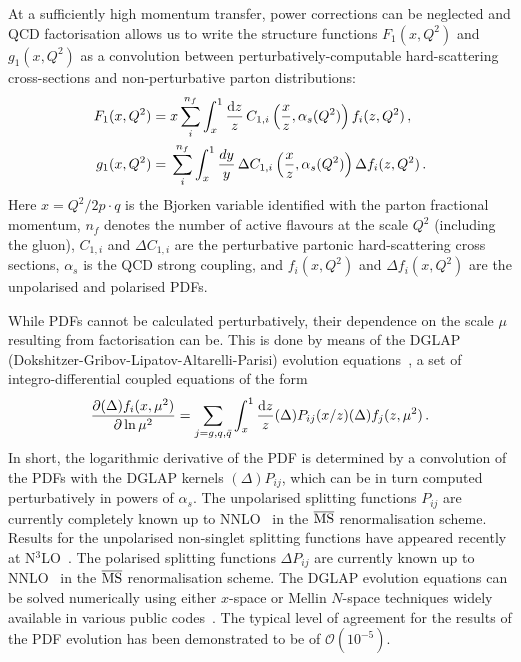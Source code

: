 At a sufficiently high momentum transfer, power corrections can be neglected and
QCD factorisation allows us to write the structure functions 
$F_1(x,Q^2)$ and $g_1(x,Q^2)$ as a convolution between perturbatively-computable
hard-scattering cross-sections and non-perturbative parton distributions:
\begin{align}
F_1(x,Q^2) 
= {} 
& x\sum_i^{n_f} \int_x^1 \frac{{\rm d}z}{z}\,C_{1,i}\left(\frac{x}{z},\alpha_s(Q^2)\right)f_i(z,Q^2) \,, \label{eq:Fi}\\
g_1(x,Q^2) 
= {} 
& \sum_i^{n_f} \int_x^1\frac{dy}{y}\, \Delta C_{1,i}\left(\frac{x}{z},\alpha_s(Q^2)\right) \Delta f_i(z,Q^2) \,.
\label{pdf}
\end{align}
%
Here $x=Q^2/2p\cdot q$ is the Bjorken variable identified with the parton
fractional momentum, $n_f$ denotes the number of active
flavours at the scale $Q^2$ (including the gluon), $C_{1,i}$ and 
$\Delta C_{1,i}$ are the perturbative partonic hard-scattering cross sections,
$\alpha_s$ is the QCD strong coupling, and $f_i(x,Q^2)$ and $\Delta f_i(x,Q^2)$ 
are the unpolarised and polarised PDFs.

While PDFs cannot be calculated perturbatively, their dependence on the scale 
$\mu$ resulting from factorisation can be.
%
This is done by means of the
DGLAP (Dokshitzer-Gribov-Lipatov-Altarelli-Parisi) 
evolution equations~\cite{Dokshitzer:1977sg,Gribov:1972ri,Altarelli:1977zs},
a set of integro-differential coupled equations of the form
\begin{equation}
  \label{eq:dglap}
\frac{\partial (\Delta)f_i(x,\mu^2)}{\partial \ln \mu^2}
=
\sum_{j=g,q,\bar{q}}\int_x^1 
\frac{{\rm d}z}{z}(\Delta)P_{ij}(x/z)(\Delta)f_j(z,\mu^2)\, .
\end{equation}
%
In short, the logarithmic derivative of the PDF is determined by a convolution
of the PDFs with the DGLAP kernels $(\Delta)P_{ij}$, which can be in turn 
computed perturbatively in powers of $\alpha_{s}$.
%
The unpolarised splitting functions $P_{ij}$ are currently completely known up  
to NNLO~\cite{mvvns,Vogt:2004mw} in the $\overline{\rm MS}$ 
renormalisation scheme.
%
Results for the unpolarised non-singlet splitting functions have appeared 
recently at N$^3$LO~\cite{Davies:2016jie,Moch:2017uml}.
%
The polarised splitting functions $\Delta P_{ij}$ are currently known up to  
NNLO~\cite{Moch:2014sna} in the $\overline{\rm MS}$ renormalisation scheme.
%
The DGLAP evolution equations can be solved numerically using
either $x$-space or Mellin $N$-space techniques widely available in various
public codes~\cite{Vogt:2004ns,Salam:2008qg,Botje:2010ay,
Bertone:2013vaa,Bertone:2015cwa}.
%
The typical level of agreement for the results of the PDF evolution 
has been demonstrated to be of $\mathcal{O}(10^{-5})$.

